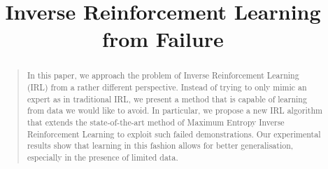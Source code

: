 \documentclass[letterpaper]{article}
\begin{document}
%
\title{Inverse Reinforcement Learning from Failure}
\maketitle
\begin{abstract}
\begin{quote}
In this paper, we approach the problem of Inverse Reinforcement Learning (IRL) from a rather different perspective. Instead of trying to only mimic an expert as in traditional IRL, we present a method that is capable of learning from data we would like to avoid. In particular, we propose a new IRL algorithm that extends the state-of-the-art method of Maximum Entropy Inverse Reinforcement Learning to exploit such failed demonstrations. Our experimental results show that learning in this fashion allows for better generalisation, especially in the presence of limited data.
\end{quote}
\end{abstract}
\end{document}
